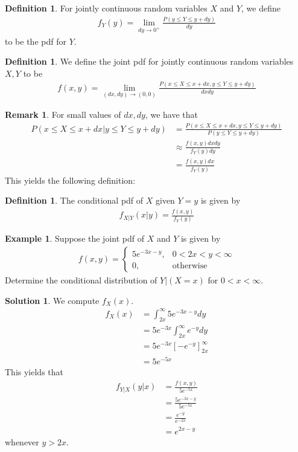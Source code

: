 \documentclass[11pt]{amsart}
\theoremstyle{definition}
\newtheorem{definition}[theorem]{Definition}
\newtheorem{remark}[theorem]{Remark}
\newtheorem{example}[theorem]{Example}
\newtheorem{solution}[theorem]{Solution}
\numberwithin{equation}{section}
\begin{document}
\begin{definition}
    For jointly continuous random variables $X$ and $Y$, we define
    \begin{align*}
        f_Y(y)=\lim_{dy\to0^+}\frac{P(y\le Y\le y+dy)}{dy}
    \end{align*}
    to be the pdf for $Y$.
\end{definition}
\begin{definition}
    We define the joint pdf for jointly continuous random variables $X,Y$ to be
    \begin{align*}
        f(x,y)=\lim_{(dx,dy)\to(0,0)}\frac{P(x\le X\le x+dx,y\le Y\le y+dy)}{dxdy}
    \end{align*}
\end{definition}
\begin{remark}
    For small values of $dx,dy$, we have that
    \begin{align*}
        P(x\le X\le x+dx|y\le Y\le y+dy)&=\frac{P(x\le X\le x+dx,y\le Y\le y+dy)}{P(y\le Y\le y+dy)}\\
        &\approx\frac{f(x,y)dxdy}{f_Y(y)dy}\\
        &=\frac{f(x,y)dx}{f_Y(y)}
    \end{align*}
    This yields the following definition:
\end{remark}
\begin{definition}
    The conditional pdf of $X$ given $Y=y$ is given by
    \begin{align*}
        f_{X|Y}(x|y)=\frac{f(x,y)}{f_Y(y)}
    \end{align*}
 \end{definition}
 \begin{example}
     Suppose the joint pdf of $X$ and $Y$ is given by
     \begin{align*}
         f(x,y)=\begin{cases}
             5e^{-3x-y}, & 0<2x<y<\infty\\
             0, &\text{otherwise}
         \end{cases}
     \end{align*}
     Determine the conditional distribution of $Y|(X=x)$ for $0<x<\infty$.
 \end{example}
 \addtocounter{theorem}{-1}
 \begin{solution}
     We compute $f_X(x)$.
     \begin{align*}
         f_X(x)&=\int_{2x}^\infty5e^{-3x-y}dy\\
         &=5e^{-3x}\int_{2x}^\infty e^{-y}dy\\
         &=5e^{-3x}[-e^{-y}]^\infty_{2x}\\
         &=5e^{-5x}
     \end{align*}
     This yields that 
     \begin{align*}
         f_{Y|X}(y|x)&=\frac{f(x,y)}{5e^{-5x}}\\
         &=\frac{5e^{-3x-y}}{5e^{-5x}}\\
         &=\frac{e^{-y}}{e^{-2x}}\\
         &=e^{2x-y}
     \end{align*}
     whenever $y>2x$.
 \end{solution}
\end{document}
